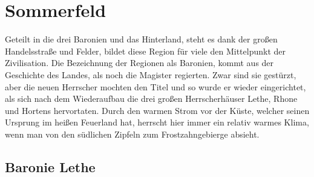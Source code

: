 \documentclass[a4paper,12pt,oneside]{book}
\begin{document}
\chapter{Sommerfeld}
Geteilt in die drei Baronien und das Hinterland, steht es dank der großen Handelsstraße und Felder, bildet diese Region für viele den Mittelpunkt der Zivilisation. Die Bezeichnung der Regionen als Baronien, kommt aus der Geschichte des Landes, als noch die Magister regierten. Zwar sind sie gestürzt, aber die neuen Herrscher mochten den Titel und so wurde er wieder eingerichtet, als sich nach dem Wiederaufbau die drei großen Herrscherhäuser Lethe, Rhone und Hortens hervortaten. Durch den warmen Strom vor der Küste, welcher seinen Ursprung im heißen Feuerland hat, herrscht hier immer ein relativ warmes Klima, wenn man von den südlichen Zipfeln zum Frostzahngebierge absieht. 

\section{Baronie Lethe}
\end{document}
